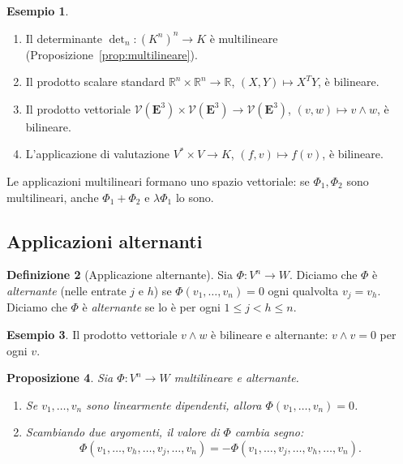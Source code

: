 \documentclass[11pt, a4paper]{book}
\theoremstyle{definition}
\newtheorem{definizione}{Definizione}[section]
\newtheorem{esempio}[definizione]{Esempio}
\theoremstyle{plain}
\newtheorem{proposizione}[definizione]{Proposizione}
\theoremstyle{remark}
\newcommand{\R}{\mathbb{R}}
\begin{document}
\begin{exbox}
\begin{esempio}
\leavevmode
\begin{enumerate}
  \item Il determinante $\det_n \colon (K^n)^n \to K$ è multilineare (Proposizione~\ref{prop:multilineare}).
  \item Il prodotto scalare standard $\R^n \times \R^n \to \R$, $(X,Y) \mapsto X^T Y$, è bilineare.
  \item Il prodotto vettoriale $\mathcal{V}(\mathbf{E}^3) \times \mathcal{V}(\mathbf{E}^3) \to \mathcal{V}(\mathbf{E}^3)$, $(v,w) \mapsto v \wedge w$, è bilineare.
  \item L'applicazione di valutazione $V^* \times V \to K$, $(f,v) \mapsto f(v)$, è bilineare.
\end{enumerate}
\end{esempio}
\end{exbox}

Le applicazioni multilineari formano uno spazio vettoriale: se $\Phi_1,\Phi_2$ sono multilineari, anche $\Phi_1 + \Phi_2$ e $\lambda\Phi_1$ lo sono.

\subsection{Applicazioni alternanti}

\begin{defbox}
\begin{definizione}[Applicazione alternante]
Sia $\Phi \colon V^n \to W$. Diciamo che $\Phi$ è \emph{alternante} (nelle entrate $j$ e $h$) se $\Phi(v_1,\ldots,v_n) = 0$ ogni qualvolta $v_j = v_h$. Diciamo che $\Phi$ è \emph{alternante} se lo è per ogni $1 \leq j < h \leq n$.
\end{definizione}
\end{defbox}

\begin{exbox}
\begin{esempio}
Il prodotto vettoriale $v \wedge w$ è bilineare e alternante: $v \wedge v = 0$ per ogni $v$.
\end{esempio}
\end{exbox}

\begin{proposizione}
\label{prop:alt-proprieta}
Sia $\Phi \colon V^n \to W$ multilineare e alternante.
\begin{enumerate}
  \item Se $v_1,\ldots,v_n$ sono linearmente dipendenti, allora $\Phi(v_1,\ldots,v_n) = 0$.
  \item Scambiando due argomenti, il valore di $\Phi$ cambia segno:
  \[
    \Phi(v_1,\ldots,v_h,\ldots,v_j,\ldots,v_n) = -\Phi(v_1,\ldots,v_j,\ldots,v_h,\ldots,v_n).
  \]
\end{enumerate}
\end{proposizione}
\end{document}
